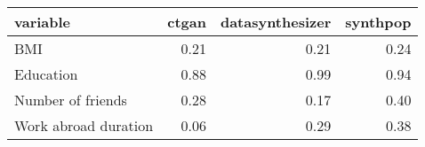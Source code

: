 \begin{tabular}{lrrr}
  \toprule
variable & ctgan & datasynthesizer & synthpop \\ 
  \midrule
BMI & 0.21 & 0.21 & 0.24 \\ 
  Education & 0.88 & 0.99 & 0.94 \\ 
  Number of friends & 0.28 & 0.17 & 0.40 \\ 
  Work abroad duration & 0.06 & 0.29 & 0.38 \\ 
   \bottomrule
\end{tabular}
